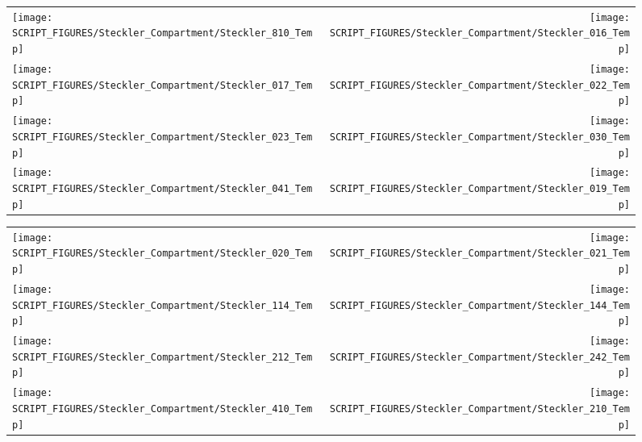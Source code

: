 \begin{figure}[!ht]
\begin{tabular*}{\textwidth}{l@{\extracolsep{\fill}}r}
\texttt{[image: SCRIPT\_FIGURES/Steckler\_Compartment/Steckler\_810\_Temp]} &
\texttt{[image: SCRIPT\_FIGURES/Steckler\_Compartment/Steckler\_016\_Temp]} \\
\texttt{[image: SCRIPT\_FIGURES/Steckler\_Compartment/Steckler\_017\_Temp]} &
\texttt{[image: SCRIPT\_FIGURES/Steckler\_Compartment/Steckler\_022\_Temp]} \\
\texttt{[image: SCRIPT\_FIGURES/Steckler\_Compartment/Steckler\_023\_Temp]} &
\texttt{[image: SCRIPT\_FIGURES/Steckler\_Compartment/Steckler\_030\_Temp]} \\
\texttt{[image: SCRIPT\_FIGURES/Steckler\_Compartment/Steckler\_041\_Temp]} &
\texttt{[image: SCRIPT\_FIGURES/Steckler\_Compartment/Steckler\_019\_Temp]}
\end{tabular*}
\label{Steckler_Temp_2}
\end{figure}

\begin{figure}[!ht]
\begin{tabular*}{\textwidth}{l@{\extracolsep{\fill}}r}
\texttt{[image: SCRIPT\_FIGURES/Steckler\_Compartment/Steckler\_020\_Temp]} &
\texttt{[image: SCRIPT\_FIGURES/Steckler\_Compartment/Steckler\_021\_Temp]} \\
\texttt{[image: SCRIPT\_FIGURES/Steckler\_Compartment/Steckler\_114\_Temp]} &
\texttt{[image: SCRIPT\_FIGURES/Steckler\_Compartment/Steckler\_144\_Temp]} \\
\texttt{[image: SCRIPT\_FIGURES/Steckler\_Compartment/Steckler\_212\_Temp]} &
\texttt{[image: SCRIPT\_FIGURES/Steckler\_Compartment/Steckler\_242\_Temp]} \\
\texttt{[image: SCRIPT\_FIGURES/Steckler\_Compartment/Steckler\_410\_Temp]} &
\texttt{[image: SCRIPT\_FIGURES/Steckler\_Compartment/Steckler\_210\_Temp]}
\end{tabular*}
\label{Steckler_Temp_3}
\end{figure}

